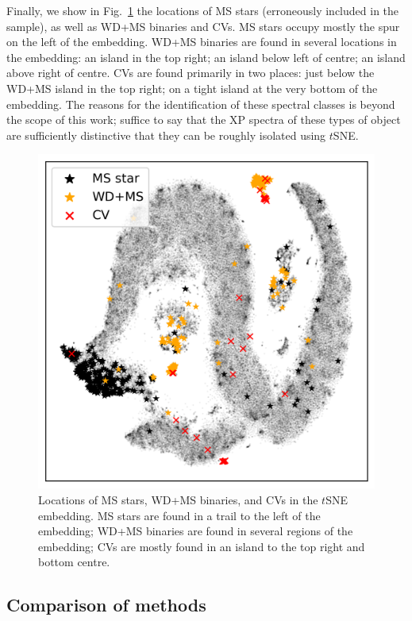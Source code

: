 \documentclass[fleqn,usenatbib]{rasti}
\begin{document}
Finally, we show in Fig.~\ref{fig:mswdmscv} the locations of MS stars (erroneously included in the sample), as well as WD+MS binaries and CVs.
MS stars occupy mostly the spur on the left of the embedding.
WD+MS binaries are found in several locations in the embedding: an island in the top right; an island below left of centre; an island above right of centre.
CVs are found primarily in two places: just below the WD+MS island in the top right; on a tight island at the very bottom of the embedding.
The reasons for the identification of these spectral classes is beyond the scope of this work; suffice to say that the XP spectra of these types of object are sufficiently distinctive that they can be roughly isolated using $t$SNE.

\begin{figure}
\centering
\includegraphics[width=\columnwidth]{figures/fig6_ms.png}
\caption{
    Locations of MS stars, WD+MS binaries, and CVs in the $t$SNE embedding.
    MS stars are found in a trail to the left of the embedding; WD+MS binaries are found in several regions of the embedding; CVs are mostly found in an island to the top right and bottom centre.
}
\label{fig:mswdmscv}
\end{figure}


\subsection{Comparison of methods}
\label{sec:comparison}
\end{document}
